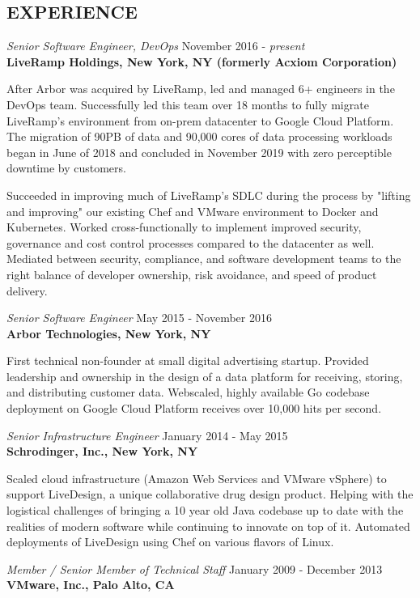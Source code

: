 \documentclass[overlapped,line,margin]{res}
\begin{document}
\begin{resume}
\section{EXPERIENCE}
\textit{Senior Software Engineer, DevOps} \hfill November 2016 - \textit{present} \\
\textbf{LiveRamp Holdings, New York, NY (formerly Acxiom Corporation)}

  After Arbor was acquired by LiveRamp, led and managed 6+ engineers in
  the DevOps team. Successfully led this team over 18 months to fully
  migrate LiveRamp's environment from on-prem datacenter to Google Cloud
  Platform. The migration of 90PB of data and 90,000 cores of data
  processing workloads began in June of 2018 and concluded in November
  2019 with zero perceptible downtime by customers.

  Succeeded in improving much of LiveRamp's SDLC during the process by
  "lifting and improving" our existing Chef and VMware environment to
  Docker and Kubernetes. Worked cross-functionally to implement improved
  security, governance and cost control processes compared to the
  datacenter as well.  Mediated between security, compliance, and
  software development teams to the right balance of developer
  ownership, risk avoidance, and speed of product delivery.

\textit{Senior Software Engineer} \hfill May 2015 - November 2016 \\
\textbf{Arbor Technologies, New York, NY}

  First technical non-founder at small digital advertising startup.
  Provided leadership and ownership in the design of a data platform for
  receiving, storing, and distributing customer data. Webscaled, highly
  available Go codebase deployment on Google Cloud Platform receives
  over 10,000 hits per second.

\textit{Senior Infrastructure Engineer} \hfill January 2014 - May 2015 \\
\textbf{Schrodinger, Inc., New York, NY}

  Scaled cloud infrastructure (Amazon Web Services and VMware vSphere) to
  support LiveDesign, a unique collaborative drug design product. Helping with
  the logistical challenges of bringing a 10 year old Java codebase up to date
  with the realities of modern software while continuing to innovate on top of
  it. Automated deployments of LiveDesign using Chef on various flavors of
  Linux.

\textit{Member / Senior Member of Technical Staff} \hfill January 2009 - December 2013 \\
\textbf{VMware, Inc., Palo Alto, CA}


\end{resume}
\end{document}
